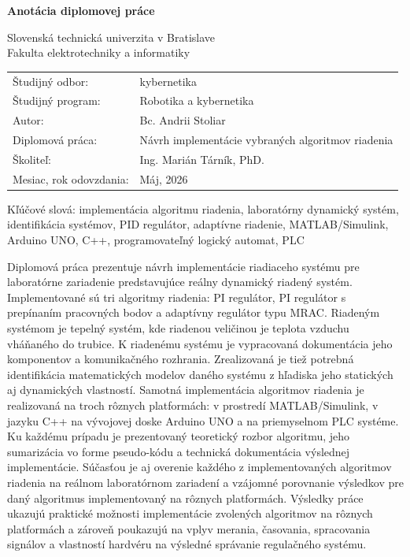 \thispagestyle{empty}


\noindent 
\textsf{\textbf{\Large Anotácia diplomovej práce}}

\medskip



\noindent
Slovenská technická univerzita v Bratislave \\
Fakulta elektrotechniky a informatiky

\bigskip
\noindent
\begin{tabular}{@{}l l}
Študijný odbor: & kybernetika \\
Študijný program: & Robotika a kybernetika \\
Autor: & Bc. Andrii Stoliar \\
Diplomová práca: & Návrh implementácie vybraných algoritmov riadenia \\
Školiteľ: & Ing. Marián Tárník, PhD. \\
Mesiac, rok odovzdania: & Máj, 2026 \\
\end{tabular}

\bigskip
\noindent
Kľúčové slová: 
implementácia algoritmu riadenia, laboratórny dynamický systém, identifikácia systémov, PID regulátor, adaptívne riadenie, MATLAB/Simulink, Arduino UNO, C++, programovateľný logický automat, PLC


\bigskip
\noindent
Diplomová práca prezentuje návrh implementácie riadiaceho systému pre laboratórne zariadenie predstavujúce reálny dynamický riadený systém. Implementované sú tri algoritmy riadenia: PI regulátor, PI regulátor s prepínaním pracovných bodov a adaptívny regulátor typu MRAC. Riadeným systémom je tepelný systém, kde riadenou veličinou je teplota vzduchu vháňaného do trubice. K riadenému systému je vypracovaná dokumentácia jeho komponentov a komunikačného rozhrania. Zrealizovaná je tiež potrebná identifikácia matematických modelov daného systému z hľadiska jeho statických aj dynamických vlastností.
Samotná implementácia algoritmov riadenia je realizovaná na troch rôznych platformách: v prostredí MATLAB/Simulink, v jazyku C++ na vývojovej doske Arduino UNO a na priemyselnom PLC systéme. Ku každému prípadu je prezentovaný teoretický rozbor algoritmu, jeho sumarizácia vo forme pseudo-kódu a technická dokumentácia výslednej implementácie. Súčasťou je aj overenie každého z implementovaných algoritmov riadenia na reálnom laboratórnom zariadení a vzájomné porovnanie výsledkov pre daný algoritmus implementovaný na rôznych platformách.
Výsledky práce ukazujú praktické možnosti implementácie zvolených algoritmov
na rôznych platformách a zároveň poukazujú na vplyv merania, časovania,
spracovania signálov a vlastností hardvéru na výsledné správanie regulačného
systému.


\pagebreak